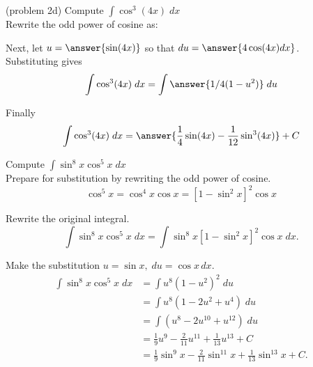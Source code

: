 \documentclass[handout]{ximera}
\begin{document}
\begin{problem}(problem 2d)
Compute $\displaystyle{\int \cos^3(4x) \; dx}$\\

Rewrite the odd power of cosine as:

\begin{multipleChoice}
\end{multipleChoice}

Next, let $u = \answer{\sin(4x)}$ so that $du = \answer{4\cos(4x) dx}$.\\

Substituting gives
\[
\int \cos^3(4x) \; dx= \int \answer{1/4 (1-u^2)} \; du
\]

Finally
\[
\int \cos^3(4x) \; dx= \answer{\frac14 \sin(4x) - \frac{1}{12} \sin^3(4x) } + C
\]

\end{problem}





\begin{example}[example 3]
Compute $\displaystyle{\int \sin^8 x\cos^5 x \; dx}$\\

Prepare for substitution by rewriting the odd power of cosine.
\[
\cos^5 x = \cos^4 x \cos x = \left[1 - \sin^2 x\right]^2 \cos x
\]

Rewrite the original integral.
\[
\int \sin^8 x\cos^5 x \; dx = \int \sin^8 x\left[1 - \sin^2 x\right]^2 \cos x \; dx.
\]

Make the substitution $u = \sin x, \; du = \cos x \, dx$.
\begin{align*}
\int \sin^8 x\cos^5 x \; dx &= \int u^8 (1-u^2)^2 \; du\\
   &= \int u^8 (1-2u^2 + u^4) \; du\\
   &= \int (u^8 -2u^{10} + u^{12}) \; du\\
  &= \tfrac19 u^9 - \tfrac{2}{11}u^{11} + \tfrac{1}{13} u^{13} + C \\
  &= \tfrac19 \sin^9 x - \tfrac{2}{11} \sin^{11} x  + \tfrac{1}{13} \sin^{13} x + C.
\end{align*}
  
\end{example}
\end{document}

